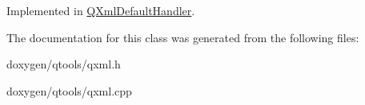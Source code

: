 Implemented in \mbox{\hyperlink{class_q_xml_default_handler_ae4fe530e822e9d5d92a1c849c3f96488}{Q\+Xml\+Default\+Handler}}.



The documentation for this class was generated from the following files\+:\begin{DoxyCompactItemize}
\item 
doxygen/qtools/qxml.\+h\item 
doxygen/qtools/qxml.\+cpp\end{DoxyCompactItemize}
